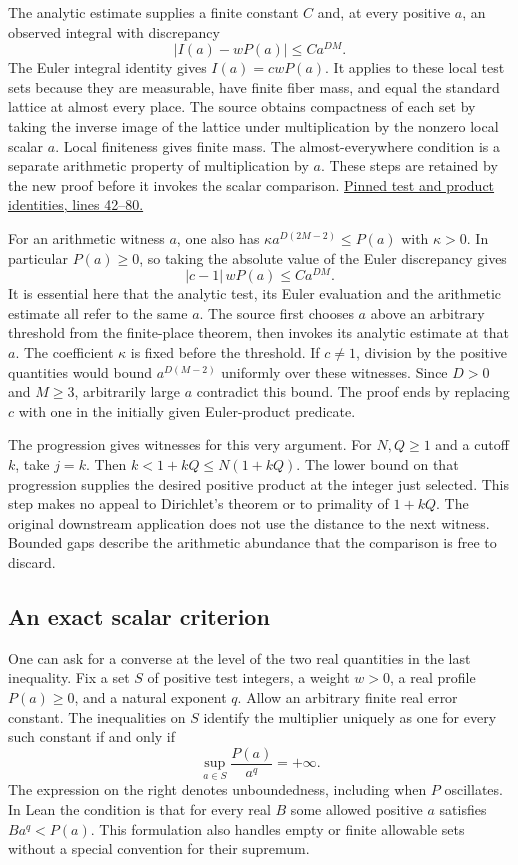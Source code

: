 \documentclass[12pt,letterpaper]{article}
\begin{document}
The analytic estimate supplies a finite constant $C$ and, at every positive $a$, an observed integral with discrepancy
\[
              |I(a)-wP(a)|\le C a^{DM}.
\]
The Euler integral identity gives $I(a)=cwP(a)$. It applies to these local test sets because they are measurable, have finite fiber mass, and equal the standard lattice at almost every place. The source obtains compactness of each set by taking the inverse image of the lattice under multiplication by the nonzero local scalar $a$. Local finiteness gives finite mass. The almost-everywhere condition is a separate arithmetic property of multiplication by $a$. These steps are retained by the new proof before it invokes the scalar comparison. \href{https://github.com/nousentllc/riemann-hypothesis/blob/40e56bab026552e089d7afcfeff08d2defb9c005/src/CompanionTheory/AutomorphicTheory/ThetaDilations/SwOne.lean#L42-L80}{Pinned test and product identities, lines 42--80.}

For an arithmetic witness $a$, one also has $\kappa a^{D(2M-2)}\le P(a)$ with $\kappa>0$. In particular $P(a)\ge0$, so taking the absolute value of the Euler discrepancy gives
\[
            |c-1|\, w P(a)\le C a^{DM}.
\]
It is essential here that the analytic test, its Euler evaluation and the arithmetic estimate all refer to the same $a$. The source first chooses $a$ above an arbitrary threshold from the finite-place theorem, then invokes its analytic estimate at that $a$. The coefficient $\kappa$ is fixed before the threshold. If $c\ne1$, division by the positive quantities would bound $a^{D(M-2)}$ uniformly over these witnesses. Since $D>0$ and $M\ge3$, arbitrarily large $a$ contradict this bound. The proof ends by replacing $c$ with one in the initially given Euler-product predicate.

The progression gives witnesses for this very argument. For $N,Q\ge1$ and a cutoff $k$, take $j=k$. Then $k<1+kQ\le N(1+kQ)$. The lower bound on that progression supplies the desired positive product at the integer just selected. This step makes no appeal to Dirichlet's theorem or to primality of $1+kQ$. The original downstream application does not use the distance to the next witness. Bounded gaps describe the arithmetic abundance that the comparison is free to discard.

\subsection{An exact scalar criterion}

One can ask for a converse at the level of the two real quantities in the last inequality. Fix a set $S$ of positive test integers, a weight $w>0$, a real profile $P(a)\ge0$, and a natural exponent $q$. Allow an arbitrary finite real error constant. The inequalities on $S$ identify the multiplier uniquely as one for every such constant if and only if
\[
                   \sup_{a\in S}\frac{P(a)}{a^q}=+\infty.
\]
The expression on the right denotes unboundedness, including when $P$ oscillates. In Lean the condition is that for every real $B$ some allowed positive $a$ satisfies $Ba^q<P(a)$. This formulation also handles empty or finite allowable sets without a special convention for their supremum.
\end{document}
